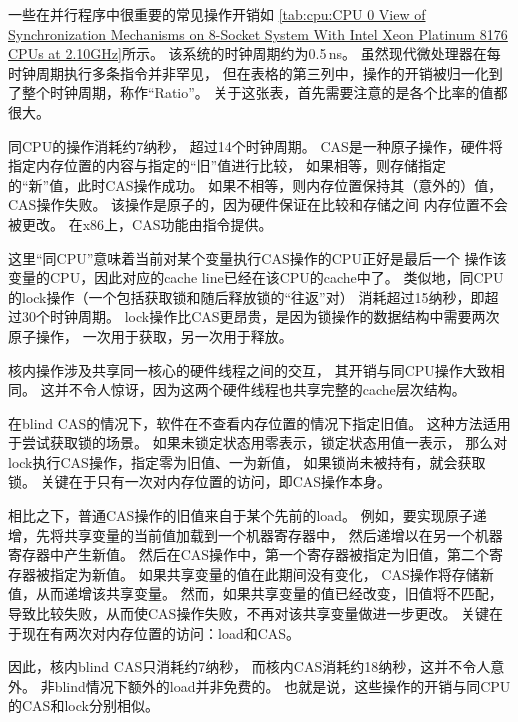 一些在并行程序中很重要的常见操作开销如
\cref{tab:cpu:CPU 0 View of Synchronization Mechanisms on 8-Socket System With Intel Xeon Platinum 8176 CPUs at 2.10GHz}所示。
该系统的时钟周期约为0.5\,ns。
虽然现代微处理器在每时钟周期执行多条指令并非罕见，
但在表格的第三列中，操作的开销被归一化到了整个时钟周期，称作``Ratio''。
关于这张表，首先需要注意的是各个比率的值都很大。

同CPU的操作消耗约7纳秒，
超过14个时钟周期。
CAS是一种原子操作，硬件将指定内存位置的内容与指定的``旧''值进行比较，
如果相等，则存储指定的``新''值，此时CAS操作成功。
如果不相等，则内存位置保持其（意外的）值，CAS操作失败。
该操作是原子的，因为硬件保证在比较和存储之间
内存位置不会被更改。
在x86上，CAS功能由指令提供。

这里``同CPU''意味着当前对某个变量执行CAS操作的CPU正好是最后一个
操作该变量的CPU，因此对应的cache line已经在该CPU的cache中了。
类似地，同CPU的lock操作（一个包括获取锁和随后释放锁的``往返''对）
消耗超过15纳秒，即超过30个时钟周期。
lock操作比CAS更昂贵，是因为锁操作的数据结构中需要两次原子操作，
一次用于获取，另一次用于释放。

核内操作涉及共享同一核心的硬件线程之间的交互，
其开销与同CPU操作大致相同。
这并不令人惊讶，因为这两个硬件线程也共享完整的cache层次结构。

在blind CAS的情况下，软件在不查看内存位置的情况下指定旧值。
这种方法适用于尝试获取锁的场景。
如果未锁定状态用零表示，锁定状态用值一表示，
那么对lock执行CAS操作，指定零为旧值、一为新值，
如果锁尚未被持有，就会获取锁。
关键在于只有一次对内存位置的访问，即CAS操作本身。

相比之下，普通CAS操作的旧值来自于某个先前的load。
例如，要实现原子递增，先将共享变量的当前值加载到一个机器寄存器中，
然后递增以在另一个机器寄存器中产生新值。
然后在CAS操作中，第一个寄存器被指定为旧值，第二个寄存器被指定为新值。
如果共享变量的值在此期间没有变化，
CAS操作将存储新值，从而递增该共享变量。
然而，如果共享变量的值已经改变，旧值将不匹配，
导致比较失败，从而使CAS操作失败，不再对该共享变量做进一步更改。
关键在于现在有两次对内存位置的访问：load和CAS\@。

因此，核内blind CAS只消耗约7纳秒，
而核内CAS消耗约18纳秒，这并不令人意外。
非blind情况下额外的load并非免费的。
也就是说，这些操作的开销与同CPU的CAS和lock分别相似。

\QuickQuizEnd

